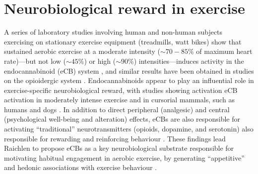 \section{Neurobiological reward in exercise\label{sect:neuroRewardGE}}
A series of laboratory studies involving human and non-human subjects exercising on stationary exercise equipment (treadmills, watt bikes) show that sustained aerobic exercise at a moderate intensity ($\sim70-85\%$ of maximum heart rate)---but not low ($\sim45\%$) or high ($\sim90\%$) intensities---induces activity in the endocannabinoid (eCB) system \citep{Raichlen2013}, and similar results have been obtained in studies on the opioidergic system \citep{Boecker2008}.  Endocannabinoids appear to play an influential role in exercise-specific neurobiological reward, with studies showing activation eCB activation in moderately intense exercise and in cursorial mammals, such as humans and dogs \citep[but not non-cursorial mammals, e.g., ferrets;][]{Raichlen2012}.  In addition to direct peripheral (analgesic) and central (psychological well-being and alteration) effects, eCBs are also responsible for activating ``traditional'' neurotransmitters (opioids, dopamine, and serotonin) also responsible for rewarding and reinforcing behaviour \citep{Sparling2003}.  These findings lead Raichlen to propose eCBs as a key neurobiological substrate responsible for motivating habitual engagement in aerobic exercise, by generating ``appetitive'' and hedonic associations with exercise behaviour \citep{Raichlen2012}.
